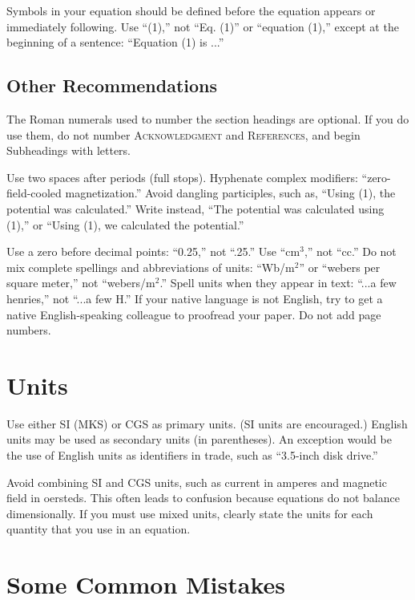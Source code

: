 \documentclass[conference,a4paper]{APSIPA2018}
\begin{document}
Symbols in your equation should be defined before the equation appears
or immediately following.  Use ``(1),'' not ``Eq. (1)'' or ``equation
(1),'' except at the beginning of a sentence: ``Equation (1) is ...''

\subsection{Other Recommendations}

The Roman numerals used to number the section headings are optional.
If you do use them, do not number {\scshape{Acknowledgment}} and
{\scshape{References}}, and begin Subheadings with letters.

Use two spaces after periods (full stops).  Hyphenate complex
modifiers: ``zero-field-cooled magnetization.''  Avoid dangling
participles, such as, ``Using (1), the potential was calculated.''
Write instead, ``The potential was calculated using (1),'' or ``Using
(1), we calculated the potential.''


\renewcommand{\textheight}{98mm}


Use a zero before decimal points: ``0.25,'' not ``.25.''  Use
``cm$^3$,'' not ``cc.''  Do not mix complete spellings and
abbreviations of units: ``Wb/m$^2$'' or ``webers per square meter,''
not ``webers/m$^2$.''  Spell units when they appear in text: ``...a
few henries,'' not ``...a few H.''  If your native language is not
English, try to get a native English-speaking colleague to proofread
your paper.  Do not add page numbers.

\section{Units}

Use either SI (MKS) or CGS as primary units. (SI units are
encouraged.) English units may be used as secondary units (in
parentheses). An exception would be the use of English units as
identifiers in trade, such as ``3.5-inch disk drive.''

Avoid combining SI and CGS units, such as current in amperes and
magnetic field in oersteds. This often leads to confusion because
equations do not balance dimensionally. If you must use mixed units,
clearly state the units for each quantity that you use in an equation.

\section{Some Common Mistakes}
\end{document}
